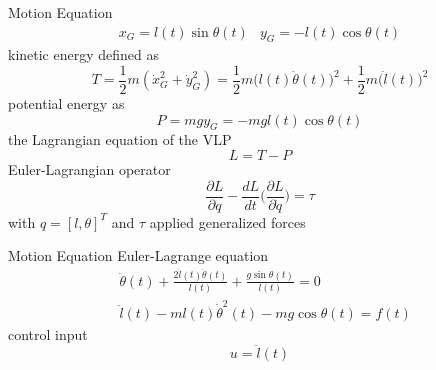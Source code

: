 \documentclass[10pt]{beamer}
\begin{document}
  \begin{frame}{Motion Equation}
    \begin{eqnarray*}
      x_G = l(t)\sin\theta(t) &  y_G = -l(t)\cos\theta(t) 
    \end{eqnarray*}
    kinetic energy defined as
    \begin{equation*}
      T = \frac{1}{2}m(\dot{x}_G^2+\dot{y}_G^2) = \frac{1}{2}m\big(l(t)\dot{\theta}(t)\big)^2+\frac{1}{2}m\big(\dot{l}(t)\big)^2 
    \end{equation*}
    potential energy as
    \begin{equation*}
      P = mgy_G = -mgl(t)\cos\theta(t)  
    \end{equation*}
    the Lagrangian equation of the VLP
    \begin{equation*}
      L = T-P
    \end{equation*}
    Euler-Lagrangian operator 
    \begin{equation*}\label{model}
      \frac{\partial L}{\partial q}   -\frac{dL}{dt}\Bigg(\frac{\partial L}{\partial \dot{q}}\Bigg) = \tau
    \end{equation*}
  with $q = [l, \theta]^T$ and $\tau$ applied generalized forces
  \end{frame}

  \begin{frame}{Motion Equation}
    Euler-Lagrange equation
    \begin{align*}
      &\ddot{\theta}(t)+\frac{2\dot{l}(t)\dot{\theta}(t)}{l(t)}+
        \frac{g\sin\theta(t)}{l(t)} = 0  \\
      &\ddot{l}(t)-ml(t)\dot{\theta}^2(t)-mg\cos\theta(t) = f(t)
    \end{align*}
    control input
    \begin{equation*}
      u = \ddot{l}(t)
    \end{equation*}
  \end{frame}
\end{document}
